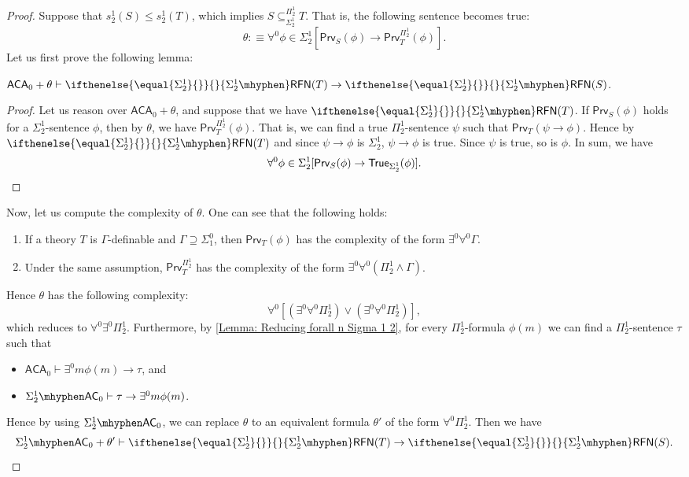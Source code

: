 \documentclass{mhkr}
\newcommand{\added}[1]{#1}
\newcommand{\Prv}{\mathsf{Prv}}
\newcommand{\RFN}[1][]{\ifthenelse{\equal{#1}{}}{}{#1\mhyphen}\mathsf{RFN}}
\newcommand{\AC}{\mathsf{AC}}
\newcommand{\ACA}{\mathsf{ACA}}
\begin{document}
\begin{proof}
    Suppose that $s^1_2(S)\le s^1_2(T)$, which implies $S\subseteq^{\Pi^1_2}_{\Sigma^1_2} T$.
    That is, the following sentence becomes true:
    \begin{equation*}
        \theta :\equiv \forall^0 \phi\in \Sigma^1_2 [\Prv_S(\phi)\to \Prv^{\Pi^1_2}_T(\phi)].
    \end{equation*}
    Let us first prove the following lemma:
    \begin{lemma*}
        $\ACA_0+\theta \vdash \RFN[\Sigma^1_2](T)\to \RFN[\Sigma^1_2](S)$.
    \end{lemma*}
    \begin{proof}
        Let us reason over $\ACA_0+\theta$, and suppose that we have $\RFN[\Sigma^1_2](T)$.
        If $\Prv_S(\phi)$ holds for a $\Sigma^1_2$-sentence $\phi$, then by $\theta$, we have $\Prv^{\Pi^1_2}_T(\phi)$. That is, we can find a true $\Pi^1_2$-sentence $\psi$ such that $\Prv_T(\psi\to\phi)$.
        Hence by $\RFN[\Sigma^1_2](T)$ and since $\psi\to\phi$ is $\Sigma^1_2$, $\psi\to\phi$ is true. Since $\psi$ is true, so is $\phi$. In sum, we have
        \begin{equation*}
            \forall^0 \phi\in \Sigma^1_2 [\Prv_S(\phi)\to \mathsf{True}_{\Sigma^1_2}(\phi)]. \qedhere 
        \end{equation*}
    \end{proof}
    Now, let us compute the complexity of $\theta$. One can see \added{that} the following holds:
    \begin{enumerate}
        \item If a theory $T$ is $\Gamma$-definable and $\Gamma\supseteq \Sigma^0_1$, then $\Prv_T(\phi)$ has the complexity of the form $\exists^0\forall^0\Gamma$.
        \item Under the same assumption, $\Prv_T^{\Pi^1_2}$ has the complexity of the form $\exists^0\forall^0(\Pi^1_2\land\Gamma)$.
    \end{enumerate}
    Hence $\theta$ has the following complexity:
    \begin{equation*}
        \forall^0 [(\exists^0\forall^0 \Pi^1_2) \lor (\exists^0\forall^0\Pi^1_2)],
    \end{equation*}
    which reduces to $\forall^0 \exists^0 \Pi^1_2$. 
    Furthermore, by \autoref{Lemma: Reducing forall n Sigma 1 2}, for every $\Pi^1_2$-formula $\phi(m)$ we can find a $\Pi^1_2$-sentence $\tau$ such that 
    \begin{itemize}
        \item $\ACA_0\vdash \exists^0 m \phi(m)\to\tau$, and
        \item $\Sigma^1_2\mhyphen\AC_0\vdash \tau\to \exists^0 m\phi(m)$.
    \end{itemize}
    Hence by using $\Sigma^1_2\mhyphen \AC_0$, we can replace $\theta$ to an equivalent formula $\theta'$ of the form $\forall^0 \Pi^1_2$. Then we have
    \begin{equation*}
        \Sigma^1_2\mhyphen\AC_0+\theta'\vdash \RFN[\Sigma^1_2](T)\to\RFN[\Sigma^1_2](S).
        \qedhere
    \end{equation*}
\end{proof}
\end{document}
